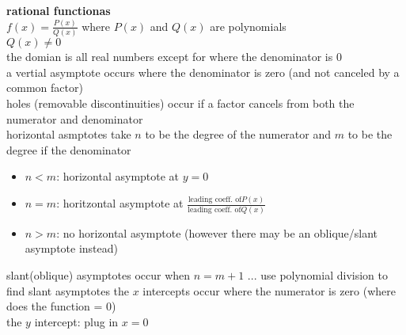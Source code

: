 \documentclass{article}
\begin{document}
\textbf{rational functionas}\\
$f(x) = \frac{P(x)}{Q(x)}$ where $P(x)$ and $Q(x)$ are polynomials\\
$Q(x) \ne 0$\\
the domian is all real numbers except for where the denominator is 0\\
a vertial asymptote occurs where the denominator is zero (and not canceled by a common factor)\\
holes (removable discontinuities) occur if a factor cancels from both the numerator and denominator\\
horizontal asmptotes take $n$ to be the degree of the numerator and $m$ to be the degree if the denominator
	\begin{itemize}
		\item $n < m$: horizontal asymptote at $y = 0$
		\item $n = m$: horitzontal asymptote at $\frac{\text{leading coeff. of}P(x)}{\text{leading coeff. of}Q(x)}$
		\item $n > m$: no horizontal asymptote (however there may be an oblique/slant asymptote instead)
	\end{itemize}
slant(oblique) asymptotes occur when $n = m+1$ ... use polynomial division to find slant asymptotes
the $x$ intercepts occur where the numerator is zero (where does the function = 0)\\
the $y$ intercept: plug in $x = 0$\\
\end{document}
